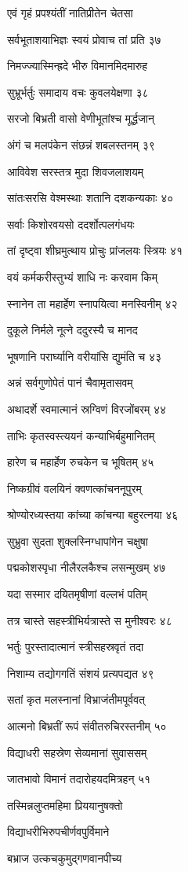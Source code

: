 एवं गृहं प्रपश्यंतीं नातिप्रीतेन चेतसा

सर्वभूताशयाभिज्ञः स्वयं प्रोवाच तां प्रति ३७

निमज्ज्यास्मिन्ह्रदे भीरु विमानमिदमारुह

सुभ्रूर्भर्तुः समादाय वचः कुवलयेक्षणा ३८

सरजो बिभ्रती वासो वेणीभूतांश्च मूर्द्धजान्

अंगं च मलपंकेन संछन्नं शबलस्तनम् ३९

आविवेश सरस्तत्र मुदा शिवजलाशयम्

सांतःसरसि वेश्मस्थाः शतानि दशकन्यकाः ४०

सर्वाः किशोरवयसो ददर्शोत्पलगंधयः

तां दृष्ट्वा शीघ्रमुत्थाय प्रोचुः प्रांजलयः स्त्रियः ४१

वयं कर्मकरीस्तुभ्यं शाधि नः करवाम किम्

स्नानेन ता महार्हेण स्नापयित्वा मनस्विनीम् ४२

दुकूले निर्मले नूत्ने ददुरस्यै च मानद

भूषणानि परार्घ्यानि वरीयांसि द्युमंति च ४३

अन्नं सर्वगुणोपेतं पानं चैवामृतासवम्

अथादर्शे स्वमात्मानं स्रग्विणं विरजोंबरम् ४४

ताभिः कृतस्वस्त्ययनं कन्याभिर्बहुमानितम्

हारेण च महार्हेण रुचकेन च भूषितम् ४५

निष्कग्रीवं वलयिनं क्वणत्कांचननूपुरम्

श्रोण्योरध्यस्तया कांच्या कांचन्या बहुरत्नया ४६

सुभ्रुवा सुदता शुक्लस्निग्धापांगेन चक्षुषा

पद्मकोशस्पृधा नीलैरलकैश्च लसन्मुखम् ४७

यदा सस्मार दयितमृषीणां वल्लभं पतिम्

तत्र चास्ते सहस्त्रीभिर्यत्रास्ते स मुनीश्वरः ४८

भर्तुः पुरस्तादात्मानं स्त्रीसहस्रवृतं तदा

निशाम्य तद्योगगतिं संशयं प्रत्यपद्यत ४९

सतां कृत मलस्नानां विभ्राजंतीमपूर्ववत्

आत्मनो बिभ्रतीं रूपं संवीतरुचिरस्तनीम् ५०

विद्याधरी सहस्रेण सेव्यमानां सुवाससम्

जातभावो विमानं तदारोहयदमित्रहन् ५१

तस्मिन्नलुप्तमहिमा प्रिययानुषक्तो

विद्याधरीभिरुपचीर्णवपुर्विमाने

बभ्राज उत्कचकुमुद्गणवानपीच्य

